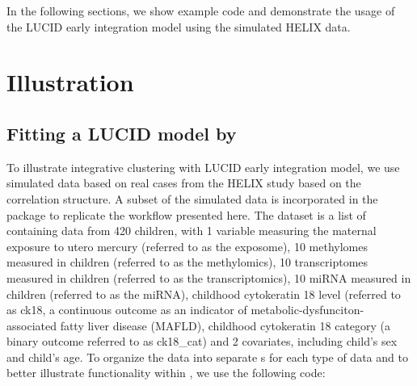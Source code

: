 In the following sections, we show example code and demonstrate the usage of the LUCID early integration model using the simulated HELIX data.

\section{Illustration} \label{sec3}

\subsection{Fitting a LUCID model by } \label{sec3.1}
To illustrate integrative clustering with LUCID early integration model, we use simulated data based on real cases from the HELIX study based on the correlation structure. A subset of the simulated data is incorporated in the  package to replicate the workflow presented here. The dataset is a list of  containing data from 420 children, with 1 variable measuring the maternal exposure to utero mercury (referred to as the exposome), 10 methylomes measured in children (referred to as the methylomics), 10 transcriptomes measured in children (referred to as the transcriptomics), 10 miRNA measured in children (referred to as the miRNA), childhood cytokeratin 18 level (referred to as ck18, a continuous outcome as an indicator of metabolic-dysfunciton-associated fatty liver disease (MAFLD), childhood cytokeratin 18 category (a binary outcome referred to as ck18{\_}cat) and 2 covariates, including child's sex and child's age. To organize the data into separate s for each type of data and to better illustrate functionality within , we use the following code: 


